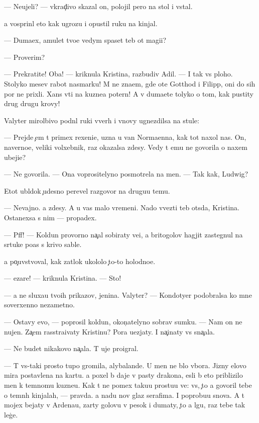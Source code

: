 \documentclass[10pt]{book}
\begin{document}
— Neujeli? — vkrad{\c}ivo skazal on, polojil pero na stol i vstal.

{\Y}a vosprin{\ia}l eto kak ugrozu i opustil ruku na kinjal.

— Duma{\y}ex, amulet tvo{\y}e{\y} vedym{\yi} spaset teb{\ia} ot magi{\y}i?

— Proverim?

— Prekratite! Oba! — kriknula Kristina, razbudiv Adil{\ia}. — I tak vs{\e} ploho. Stolyko mes{\ia}{\q}ev rabot{\yi} nasmarku! M{\yi} ne zna{\y}em, gde ote{\q} Gotthod i Filipp, oni do sih por ne prixli. Xans v{\yi}{\y}ti na kuzne{\q}a poter{\ia}n! A v{\yi} duma{\y}ete tolyko o tom, kak pustity drug drugu krovy!

Valyter mirol{\iu}bivo podn{\ia}l ruki vverh i vnovy ugnezdilsa na stule:

— Prejde {\c}em t{\yi} primex rexeni{\y}e, uzna{\y} u van Norma{\y}enna, kak tot naxol nas. On, naverno{\y}e, veliki{\y} volxebnik, raz okazalsa zdesy. Vedy t{\yi} {\y}emu ne govorila o naxem ubeji{\x}e?

— Ne govorila. — Ona voprositelyno posmotrela na men{\ia}. — Tak kak, Ludwig?

Etot ubl{\iu}dok {\c}udesno perevel razgovor na drugu{\y}u temu.

— Nevajno. {\Y}a zdesy. A u vas malo vremeni. Nado v{\yi}vezti teb{\ia} ots{\iu}da, Kristina. Ostanexsa s nim — propadex.

— Pff! — Koldun provorno na{\c}al sobiraty ve{\x}i, a britogolov{\yi}{\y} hagjit zastegnul na s{\iu}rtuke po{\y}as s krivo{\y} sable{\y}.

{\Y}a po{\c}uvstvoval, kak zat{\yi}lok ukololo {\c}to-to holodno{\y}e.

— {\C}ezare! — kriknula Kristina. — Sto{\y}!

— {\Y}a ne sluxa{\y}u tvo{\y}ih prikazov, jen{\x}ina. Valyter? — Kondotyer podobralsa ko mne soverxenno nezametno.

— Ostavy {\y}evo, — poprosil koldun, okon{\c}atelyno sobrav sumku. — Nam on ne nujen. Za{\c}em rasstra{\y}ivaty Kristinu? Pora u{\y}ezjaty. I na{\c}inaty vs{\e} sna{\c}ala.

— Ne budet nikakovo na{\c}ala. T{\yi} uje pro{\y}igral.

— T{\yi} vs{\e}-taki prosto tupo{\y} gromila, alybalande{\q}. U men{\ia} ne b{\yi}lo v{\yi}bora. Jizny {\q}elovo mira postavlena na kartu. {\Y}a poxel b{\yi} daje v pasty drakona, {\y}esli b{\yi} eto priblizilo men{\ia} k temnomu kuzne{\q}u. Kak t{\yi} ne po{\y}mex taku{\y}u prostu{\y}u ve{\x}: vs{\e}, {\c}to {\y}a govoril tebe o temn{\yi}h kinjalah, — pravda. {\Y}a na{\y}du nov{\yi}{\y} glaz serafima. I poprobu{\y}u snova. A t{\yi} mojex bejaty v Ardenau, zar{\yi}ty golovu v pesok i dumaty, {\c}to {\y}a lgu, raz tebe tak leg{\c}e.
\end{document}
